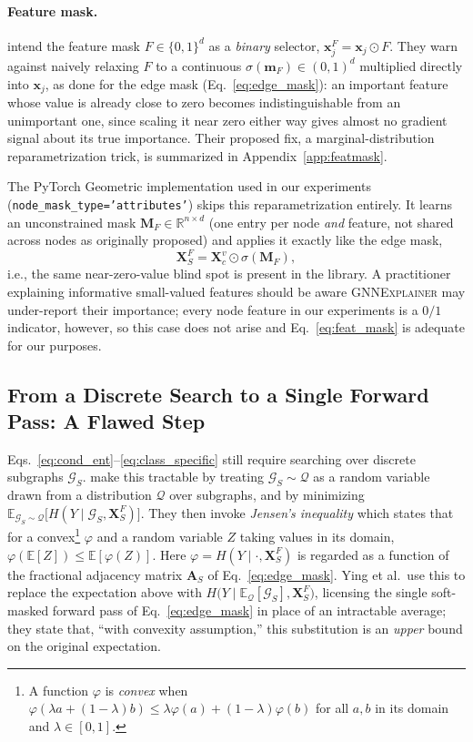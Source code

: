 \documentclass{article}
\newcommand{\GNNEx}{\textsc{GNNExplainer}\xspace}
\newcommand{\reals}{\mathbb{R}}
\newcommand{\calG}{\mathcal{G}}
\newcommand{\bfA}{\mathbf{A}}
\newcommand{\bfX}{\mathbf{X}}
\newcommand{\bfM}{\mathbf{M}}
\newcommand{\bfm}{\mathbf{m}}
\newcommand{\bfx}{\mathbf{x}}
\newcommand{\sigmoid}{\sigma}
\theoremstyle{definition}
\begin{document}
\paragraph{Feature mask.}
\citet{ying2019gnnexplainer} intend the feature mask $F \in \{0,1\}^d$ as a
\emph{binary} selector, $\bfx_j^F = \bfx_j \odot F$. They warn against
naively relaxing $F$ to a continuous $\sigmoid(\bfm_F) \in (0,1)^d$
multiplied directly into $\bfx_j$, as done for the edge mask
(Eq.~\ref{eq:edge_mask}): an important feature whose value is already close
to zero becomes indistinguishable from an unimportant one, since scaling it
near zero either way gives almost no gradient signal about its true
importance. Their proposed fix, a marginal-distribution reparametrization
trick, is summarized in Appendix~\ref{app:featmask}.

The PyTorch Geometric implementation used in our experiments
(\texttt{node\_mask\_type='attributes'}) skips this reparametrization entirely.
It learns an unconstrained mask $\bfM_F \in \reals^{n \times d}$ (one entry per
node \emph{and} feature, not shared across nodes as originally proposed) and
applies it exactly like the edge mask,
\begin{equation}
  \bfX_S^F = \bfX_c^v \odot \sigmoid(\bfM_F),
  \label{eq:feat_mask}
\end{equation}
i.e., the same near-zero-value blind spot is present in the library. A
practitioner explaining informative small-valued features should be aware
\GNNEx may under-report their importance; every node feature in our
experiments is a $0/1$ indicator, however, so this case does not arise and
Eq.~\eqref{eq:feat_mask} is adequate for our purposes.

\subsection{From a Discrete Search to a Single Forward Pass: A Flawed Step}
\label{subsec:jensen}

Eqs.~\eqref{eq:cond_ent}--\eqref{eq:class_specific} still require searching over
discrete subgraphs $\calG_S$. \citet{ying2019gnnexplainer} make this tractable
by treating $\calG_S \sim \mathcal{Q}$ as a random variable drawn from a
distribution $\mathcal{Q}$ over subgraphs, and by minimizing
$\mathbb{E}_{\calG_S \sim \mathcal{Q}}\bigl[H(Y \mid \calG_S, \bfX_S^F)\bigr]$.
They then invoke \emph{Jensen's inequality} which
states that for a convex\footnote{A function $\varphi$ is \emph{convex} when
$\varphi(\lambda a + (1{-}\lambda)b) \leq \lambda\varphi(a) + (1{-}\lambda)\varphi(b)$
for all $a,b$ in its domain and $\lambda\in[0,1]$.} $\varphi$ and a random variable $Z$ taking values in
its domain, $\varphi(\mathbb{E}[Z]) \leq \mathbb{E}[\varphi(Z)]$. Here
$\varphi = H(Y\mid\cdot,\bfX_S^F)$ is regarded as a function of the fractional
adjacency matrix $\bfA_S$ of Eq.~\eqref{eq:edge_mask}. Ying et al.\ use this
to replace the expectation above with
$H\bigl(Y \mid \mathbb{E}_{\mathcal{Q}}[\calG_S], \bfX_S^F\bigr)$, licensing
the single soft-masked forward pass of Eq.~\eqref{eq:edge_mask} in place of
an intractable average; they state that, ``with convexity assumption,''
this substitution is an \emph{upper} bound on the original expectation.
\end{document}
